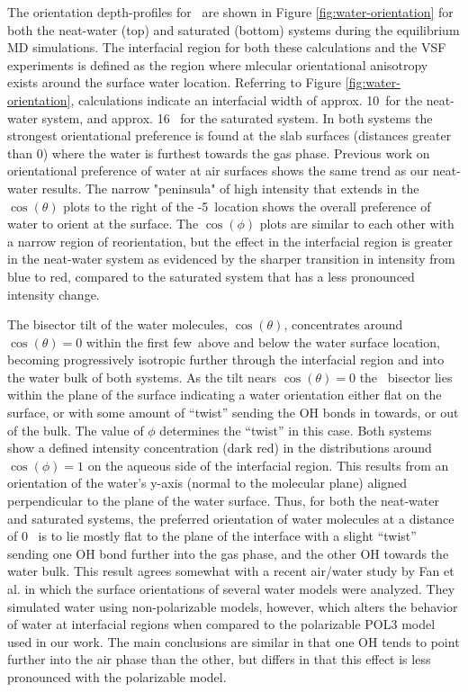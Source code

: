 The orientation depth-profiles for \wat~are shown in Figure \ref{fig:water-orientation} for both the neat-water (top) and saturated (bottom) systems during the equilibrium MD simulations. The interfacial region for both these calculations and the VSF experiments is defined as the region where mlecular orientational anisotropy exists around the surface water location. Referring to Figure \ref{fig:water-orientation}, calculations indicate an interfacial width of approx. 10\angs~for the neat-water system, and approx. 16 \angs~for the saturated system. In both systems the strongest orientational preference is found at the slab surfaces (distances greater than 0\angs) where the water is furthest towards the gas phase. Previous work on orientational preference of water at air surfaces shows the same trend as our neat-water results.\cite{Walker2006b,Hore2008} The narrow "peninsula" of high intensity that extends in the $\cos(\theta)$ plots to the right of the -5\angs~location shows the overall preference of water to orient at the surface. The $\cos(\phi)$ plots are similar to each other with a narrow region of reorientation, but the effect in the interfacial region is greater in the neat-water system as evidenced by the sharper transition in intensity from blue to red, compared to the saturated system that has a less pronounced intensity change.

The bisector tilt of the water molecules, $\cos(\theta)$, concentrates around $\cos(\theta)=0$ within the first few\angs~above and below the water surface location, becoming progressively isotropic further through the interfacial region and into the water bulk of both systems. As the tilt nears $\cos(\theta)=0$ the \wat~bisector lies within the plane of the surface indicating a water orientation either flat on the surface, or with some amount of ``twist'' sending the OH bonds in towards, or out of the bulk. The value of $\phi$ determines the ``twist'' in this case. Both systems show a defined intensity concentration (dark red) in the distributions around $\cos(\phi)=1$ on the aqueous side of the interfacial region. This results from an orientation of the water's y-axis (normal to the molecular plane) aligned perpendicular to the plane of the water surface. Thus, for both the neat-water and saturated systems, the preferred orientation of water molecules at a distance of 0\angs~ is to lie mostly flat to the plane of the interface with a slight ``twist'' sending one OH bond further into the gas phase, and the other OH towards the water bulk. This result agrees somewhat with a recent air/water study by Fan et al. in which the surface orientations of several water models were analyzed.\cite{Fan2009} They simulated water using non-polarizable models, however, which alters the behavior of water at interfacial regions when compared to the polarizable POL3 model used in our work. The main conclusions are similar in that one OH tends to point further into the air phase than the other, but differs in that this effect is less pronounced with the polarizable model.

